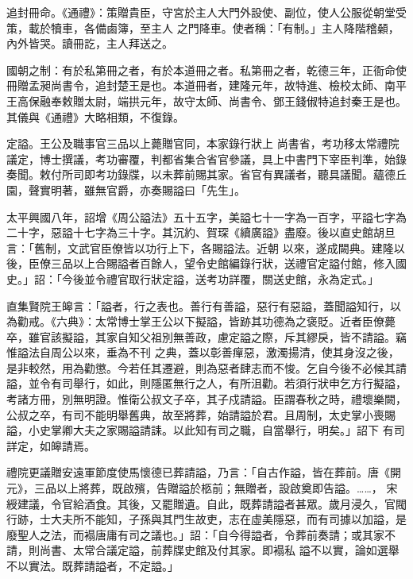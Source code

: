 \begin{pinyinscope}
 追封冊命。《通禮》：策贈貴臣，守宮於主人大門外設使、副位，使人公服從朝堂受策，載於犢車，各備鹵簿，至主人
 之門降車。使者稱：「有制。」主人降階稽顙，內外皆哭。讀冊訖，主人拜送之。



 國朝之制：有於私第冊之者，有於本道冊之者。私第冊之者，乾德三年，正衙命使冊贈孟昶尚書令，追封楚王是也。本道冊者，建隆元年，故特進、檢校太師、南平王高保融奉敕贈太尉，端拱元年，故守太師、尚書令、鄧王錢俶特追封秦王是也。其儀與《通禮》大略相類，不復錄。



 定謚。王公及職事官三品以上薨贈官同，本家錄行狀上
 尚書省，考功移太常禮院議定，博士撰議，考功審覆，判都省集合省官參議，具上中書門下宰臣判準，始錄奏聞。敕付所司即考功錄牒，以未葬前賜其家。省官有異議者，聽具議聞。蘊德丘園，聲實明著，雖無官爵，亦奏賜謚曰「先生」。



 太平興國八年，詔增《周公謚法》五十五字，美謚七十一字為一百字，平謚七字為二十字，惡謚十七字為三十字。其沉約、賀琛《續廣謚》盡廢。後以直史館胡旦言：「舊制，文武官臣僚皆以功行上下，各賜謚法。近朝
 以來，遂成闕典。建隆以後，臣僚三品以上合賜謚者百餘人，望令史館編錄行狀，送禮官定謚付館，修入國史。」詔：「今後並令禮官取行狀定謚，送考功詳覆，關送史館，永為定式。」



 直集賢院王皞言：「謚者，行之表也。善行有善謚，惡行有惡謚，蓋聞謚知行，以為勸戒。《六典》：太常博士掌王公以下擬謚，皆跡其功德為之褒貶。近者臣僚薨卒，雖官該擬謚，其家自知父祖別無善政，慮定謚之際，斥其繆戾，皆不請謚。竊惟謚法自周公以來，垂為不刊
 之典，蓋以彰善癉惡，激濁揚清，使其身沒之後，是非較然，用為勸懲。今若任其遷避，則為惡者肆志而不悛。乞自今後不必候其請謚，並令有司舉行，如此，則隱匿無行之人，有所沮勸。若須行狀申乞方行擬謚，考諸方冊，別無明證。惟衛公叔文子卒，其子戍請謚。臣謂春秋之時，禮壞樂闕，公叔之卒，有司不能明舉舊典，故至將葬，始請謚於君。且周制，太史掌小喪賜謚，小史掌卿大夫之家賜謚請誄。以此知有司之職，自當舉行，明矣。」詔下
 有司詳定，如皞請焉。



 禮院更議贈安遠軍節度使馬懷德已葬請謚，乃言：「自古作謚，皆在葬前。唐《開元》，三品以上將葬，既啟殯，告贈謚於柩前；無贈者，設啟奠即告謚。……，
 宋綬建議，令官給酒食。其後，又罷贈遺。自此，既葬請謚者甚眾。歲月浸久，官閥行跡，士大夫所不能知，子孫與其門生故吏，志在虛美隱惡，而有司據以加謚，是廢聖人之法，而褟唐庸有司之議也。」詔：「自今得謚者，令葬前奏請；或其家不請，則尚書、太常合議定謚，前葬牒史館及付其家。即褟私
 謚不以實，論如選舉不以實法。既葬請謚者，不定謚。」



\end{pinyinscope}